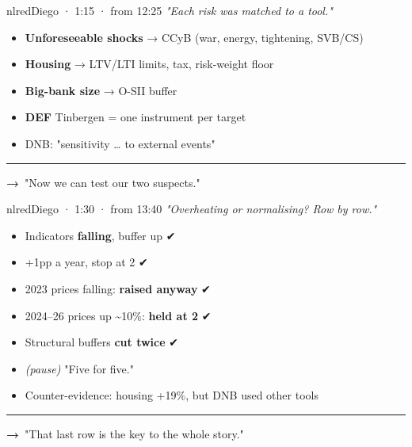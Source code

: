 \documentclass[10pt]{article}
\begin{document}
\begin{card}{nlred}{\hfill{\normalsize\mdseries Diego · 1:15 · from 12:25}}
{\large\itshape "Each risk was matched to a tool."}\par\smallskip
\begin{itemize}[label=\textcolor{nlred}{\textbullet}]\item \textbf{Unforeseeable shocks} → CCyB (war, energy, tightening, SVB/CS)\item \textbf{Housing} → LTV/LTI limits, tax, risk-weight floor\item \textbf{Big-bank size} → O-SII buffer\item \textcolor{gold!80!black}{\textbf{DEF}} Tinbergen = one instrument per target\item DNB: "sensitivity … to external events"\end{itemize}
\vfill\textcolor{grey}{\rule{\linewidth}{0.3pt}}\par{\bfseries\color{nlred}→}\ "Now we can test our two suspects."
\end{card}
\hfill
\begin{card}{nlred}{\hfill{\normalsize\mdseries Diego · 1:30 · from 13:40}}
{\large\itshape "Overheating or normalising? Row by row."}\par\smallskip
\begin{itemize}[label=\textcolor{nlred}{\textbullet}]\item Indicators \textbf{falling}, buffer up ✔\item +1pp a year, stop at 2 ✔\item 2023 prices falling: \textbf{raised anyway} ✔\item 2024–26 prices up \textasciitilde{}10\%: \textbf{held at 2} ✔\item Structural buffers \textbf{cut twice} ✔\item \emph{(pause)} "Five for five."\item Counter-evidence: housing +19\%, but DNB used other tools\end{itemize}
\vfill\textcolor{grey}{\rule{\linewidth}{0.3pt}}\par{\bfseries\color{nlred}→}\ "That last row is the key to the whole story."
\end{card}


\vspace{0.35cm}
\end{document}
